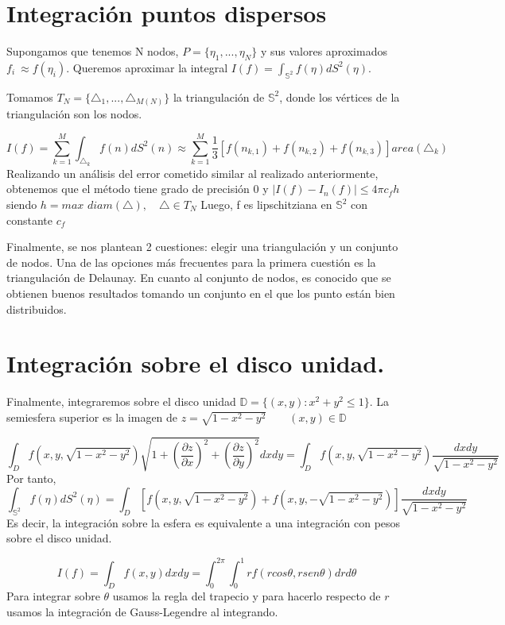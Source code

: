\section{Integración puntos dispersos}
Supongamos que tenemos N nodos, $P=\{\eta_1,...,\eta_N\}$ y sus valores aproximados $f_i~\approx f(\eta_i)$. Queremos aproximar la integral $I(f) =  \int_{\mathds{S}^2} f(\eta)dS^2(\eta)$.

\medskip
Tomamos $T_N=\{\triangle_1,...,\triangle_{M(N)}\}$ la triangulación de $\mathds{S}^2$, donde los vértices de la triangulación son los nodos.

$$
I(f) = \sum_{k=1}^{M} \int_{\triangle_k} f(n)dS^2(n) \approx  \sum_{k=1}^{M} \frac{1}{3}[f(n_{k,1})+f(n_{k,2})+f(n_{k,3})] area(\triangle_k)
$$
Realizando un análisis del error cometido similar al realizado anteriormente, obtenemos que el método tiene grado de precisión 0 y 
$|I(f)-I_n(f)|\le 4\pi c_f h$ siendo $h=max$ $diam(\triangle), \quad \triangle\in T_N$
Luego, f es lipschitziana en $\mathds{S}^2$ con constante $ c_f$

Finalmente, se nos plantean 2 cuestiones: elegir una triangulación y un conjunto de nodos. Una de las opciones más frecuentes para la primera cuestión es la triangulación de Delaunay. En cuanto al conjunto de nodos, es conocido que se obtienen buenos resultados tomando un conjunto en el que los punto están bien distribuidos.

\section{Integración sobre el disco unidad.}
Finalmente, integraremos sobre el disco unidad $\mathds{D}=\{(x,y):x^2+y^2 \le 1\}.$
La semiesfera superior es la imagen de 
$z=\sqrt{1-x^2-y^2} \qquad (x,y)\in \mathds{D}$

$$\int_{D}f(x,y,\sqrt{1-x^2-y^2})\sqrt{1+(\frac{\partial z}{\partial x})^2+(\frac{\partial z}{\partial y})^2} dx dy = \int_D f(x,y,\sqrt{1-x^2-y^2})\frac{dx dy}{\sqrt{1-x^2-y^2}}$$	
Por tanto,
$$ \int_{\mathds{S}^2}f(\eta) dS^2(\eta) = \int_D \left[f(x,y,\sqrt{1-x^2-y^2})+f(x,y,-\sqrt{1-x^2-y^2})\right]\frac{dx dy}{\sqrt{1-x^2-y^2}} $$
Es decir, la integración sobre la esfera es equivalente a una integración con pesos sobre el disco unidad.


$$I(f)=\int_{D} f(x,y) dxdy = \int_{0}^{2\pi}\int_{0}^{1} rf(rcos\theta,rsen\theta)drd\theta $$
Para integrar sobre $\theta$ usamos la regla del trapecio y para hacerlo respecto de $r$ usamos la integración de Gauss-Legendre al integrando.


